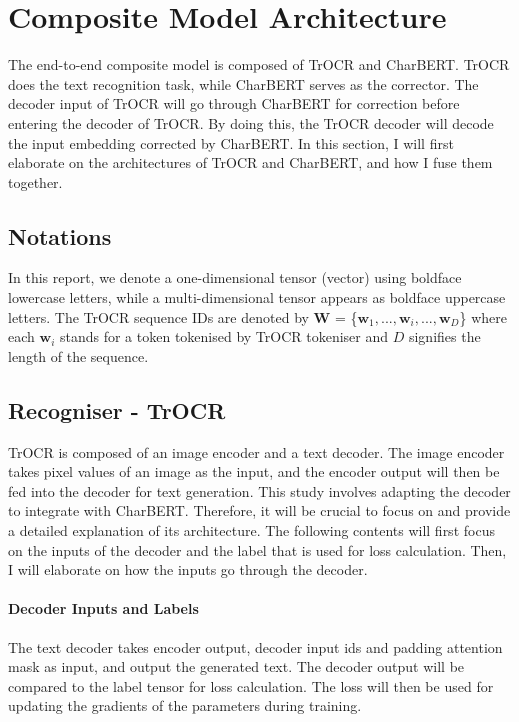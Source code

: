 \section{Composite Model Architecture}
\label{sec:3_composite_model_architecture}
The end-to-end composite model is composed of TrOCR and CharBERT. TrOCR does the text recognition task, while CharBERT serves as the corrector. The decoder input of TrOCR will go through CharBERT for correction before entering the decoder of TrOCR. By doing this, the TrOCR decoder will decode the input embedding corrected by CharBERT. In this section, I will first elaborate on the architectures of TrOCR and CharBERT, and how I fuse them together.

\subsection{Notations}
\label{subsec:3_Notations}
In this report, we denote a one-dimensional tensor (vector) using boldface lowercase letters, while a multi-dimensional tensor appears as boldface uppercase letters. The TrOCR sequence IDs are denoted by $\mathbf{W}$ = \{$\mathbf{w}_1, ..., \mathbf{w}_i, ..., \mathbf{w}_D$\} where each $\mathbf{w}_i$ stands for a token tokenised by TrOCR tokeniser and $D$ signifies the length of the sequence. 

\subsection{Recogniser - TrOCR}
\label{subsec:3_recogniser_trocr}
TrOCR is composed of an image encoder and a text decoder. The image encoder takes pixel values of an image as the input, and the encoder output will then be fed into the decoder for text generation. This study involves adapting the decoder to integrate with CharBERT.  Therefore, it will be crucial to focus on and provide a detailed explanation of its architecture. The following contents will first focus on the inputs of the decoder and the label that is used for loss calculation. Then, I will elaborate on how the inputs go through the decoder.

\paragraph*{Decoder Inputs and Labels}
\label{par:3_decoder_inputs_and_labels}
The text decoder takes encoder output, decoder input ids and padding attention mask as input, and output the generated text. The decoder output will be compared to the label tensor for loss calculation. The loss will then be used for updating the gradients of the parameters during training.

